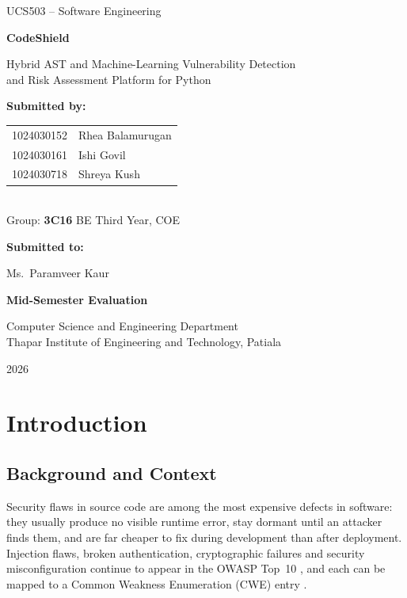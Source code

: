\documentclass[11pt,a4paper,twoside]{report}
\newcommand{\course}{UCS503 -- Software Engineering}
\begin{document}
\begin{titlepage}
\centering
{\large \course\par}
\vspace{2.2cm}
{\Huge\bfseries CodeShield\par}
\vspace{0.4cm}
{\Large Hybrid AST and Machine-Learning Vulnerability Detection\\ and Risk Assessment Platform for Python\par}
\vspace{2.2cm}
{\large\bfseries Submitted by:\par}
\vspace{0.3cm}
\begin{tabular}{ll}
1024030152 & Rhea Balamurugan\\
1024030161 & Ishi Govil\\
1024030718 & Shreya Kush
\end{tabular}\\[0.6cm]
Group: \textbf{3C16} \quad BE Third Year, COE\par
\vspace{1.4cm}
{\large\bfseries Submitted to:\par}
\vspace{0.2cm}
Ms.\ Paramveer Kaur\par
\vfill
{\large\bfseries Mid-Semester Evaluation\par}
\vspace{0.4cm}
Computer Science and Engineering Department\\
Thapar Institute of Engineering and Technology, Patiala\par
\vspace{0.3cm}
2026
\end{titlepage}

\clearpage
{}
\tableofcontents
\clearpage
\listoffigures
\clearpage
\listoftables
\clearpage
{}

\chapter{Introduction}

\section{Background and Context}
Security flaws in source code are among the most expensive defects in software: they usually produce no visible runtime error, stay dormant until an attacker finds them, and are far cheaper to fix during development than after deployment. Injection flaws, broken authentication, cryptographic failures and security misconfiguration continue to appear in the OWASP Top~10 \cite{owasp2021}, and each can be mapped to a Common Weakness Enumeration (CWE) entry \cite{cwe}.
\end{document}
